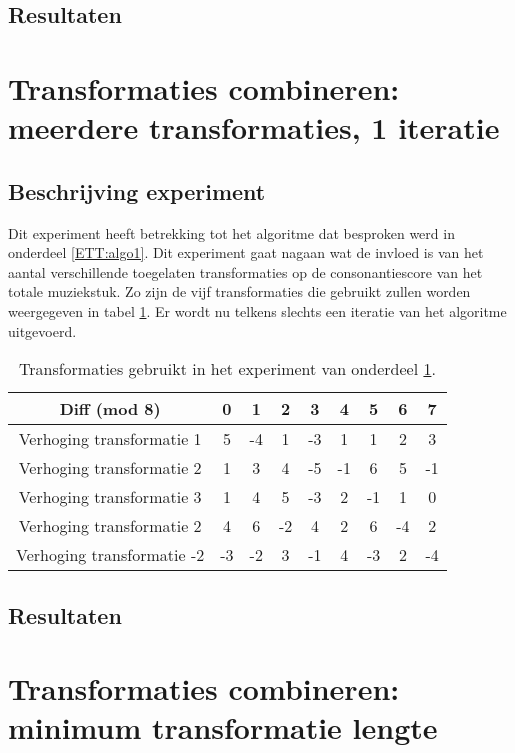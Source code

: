 \subsection{Resultaten}

\section{Transformaties combineren: meerdere transformaties, 1 iteratie}
\label{experiment:2}
\subsection{Beschrijving experiment}
Dit experiment heeft betrekking tot het algoritme dat besproken werd in onderdeel \ref{ETT:algo1}. Dit experiment gaat nagaan wat de invloed is van het aantal verschillende toegelaten transformaties op de consonantiescore van het totale muziekstuk. Zo zijn de vijf transformaties die gebruikt zullen worden weergegeven in tabel \ref{tabel:exp2}. Er wordt nu telkens slechts een iteratie van het algoritme uitgevoerd.

\begin{table}
  \centering
  \begin{tabular}{c | c c c c c c c c }
    Diff (mod 8) & 0 & 1 & 2 & 3 & 4 & 5 & 6 & 7 \\
    \hline
    \hline
    Verhoging transformatie 1 & 5 & -4 & 1 & -3 & 1 & 1 & 2 & 3 \\
    \hline
    Verhoging transformatie 2 & 1 & 3 & 4 & -5 & -1 & 6 & 5 & -1 \\
    \hline
    Verhoging transformatie 3 & 1 & 4 & 5 & -3 & 2 & -1 & 1 & 0 \\
    \hline
    Verhoging transformatie 2 & 4 & 6 & -2 & 4 & 2 & 6 & -4 & 2 \\
    \hline
    Verhoging transformatie -2 & -3 & -2 & 3 & -1 & 4 & -3 & 2 & -4 \\
  \end{tabular}
  \caption{Transformaties gebruikt in het experiment van onderdeel \ref{experiment:2}.}
  \label{tabel:exp2}
\end{table}

\subsection{Resultaten}

\section{Transformaties combineren: minimum transformatie lengte}
\label{experiment:3}

